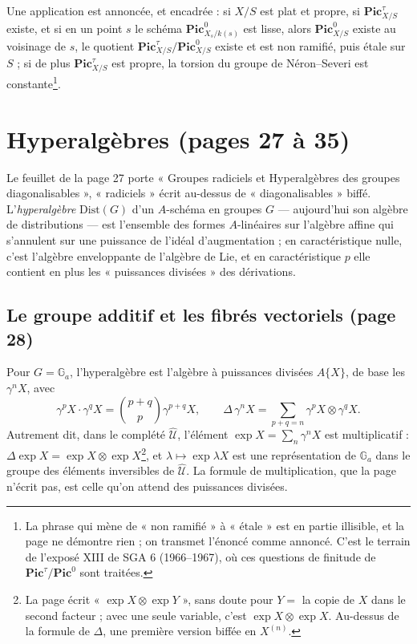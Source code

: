 \documentclass[11pt,a4paper]{article}
\begin{document}
Une application est annoncée, et encadrée : si $X/S$ est plat et propre, si
$\mathbf{Pic}^{\tau}_{X/S}$ existe, et si en un point $s$ le schéma
$\mathbf{Pic}^{0}_{X_s/k(s)}$ est lisse, alors $\mathbf{Pic}^0_{X/S}$ existe au
voisinage de $s$, le quotient $\mathbf{Pic}^{\tau}_{X/S}/\mathbf{Pic}^0_{X/S}$
existe et est non ramifié, puis étale sur $S$ ; si de plus $\mathbf{Pic}^{\tau}_{X/S}$ est propre,
la torsion du groupe de Néron--Severi est constante\footnote{La phrase
qui mène de « non ramifié » à « étale » est en partie illisible, et la page ne
démontre rien ; on transmet
l'énoncé comme annoncé. C'est le terrain de l'exposé XIII de SGA 6 (1966--1967),
où ces questions de finitude de $\mathbf{Pic}^{\tau}/\mathbf{Pic}^0$ sont
traitées.}.

\section*{Hyperalgèbres (pages 27 à 35)}

Le feuillet de la page 27 porte « Groupes radiciels et Hyperalgèbres des
groupes diagonalisables », « radiciels » écrit au-dessus de « diagonalisables »
biffé. L'\emph{hyperalgèbre} $\mathrm{Dist}(G)$ d'un $A$-schéma en groupes $G$ —
aujourd'hui son algèbre de distributions — est l'ensemble des formes
$A$-linéaires sur l'algèbre affine qui s'annulent sur une puissance de l'idéal
d'augmentation ; en caractéristique nulle, c'est l'algèbre enveloppante de
l'algèbre de Lie, et en caractéristique $p$ elle contient en plus les
« puissances divisées » des dérivations.

\subsection*{Le groupe additif et les fibrés vectoriels (page 28)}

Pour $G = \mathbb{G}_a$, l'hyperalgèbre est l'algèbre à puissances divisées
$A\{X\}$, de base les $\gamma^n X$, avec
\[
\gamma^p X \cdot \gamma^q X = \binom{p+q}{p} \gamma^{p+q} X, \qquad
\Delta\, \gamma^n X = \sum_{p+q=n} \gamma^p X \otimes \gamma^q X .
\]
Autrement dit, dans le complété $\widehat{\mathcal{U}}$, l'élément
$\exp X = \sum_n \gamma^n X$ est multiplicatif :
$\Delta \exp X = \exp X \otimes \exp X$\footnote{La page écrit
« $\exp X \otimes \exp Y$ », sans doute pour $Y = $ la copie de $X$ dans le
second facteur ; avec une seule variable, c'est $\exp X \otimes \exp X$. Au-dessus
de la formule de $\Delta$, une première version biffée en $X^{(n)}$.}, et
$\lambda \mapsto \exp \lambda X$ est une représentation de $\mathbb{G}_a$ dans le
groupe des éléments inversibles de $\widehat{\mathcal{U}}$. La formule de
multiplication, que la page n'écrit pas, est celle qu'on attend des puissances
divisées.
\end{document}
